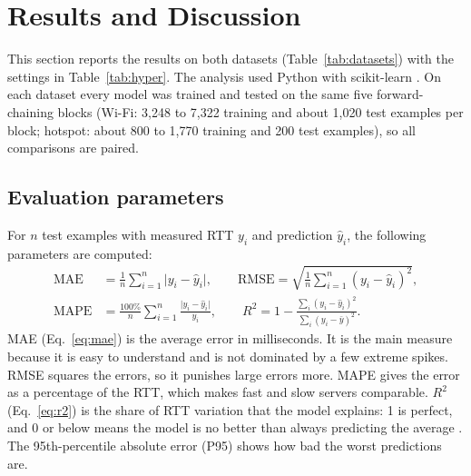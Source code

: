\documentclass[pdflatex,sn-mathphys-num]{sn-jnl}
\begin{document}
\section{Results and Discussion}\label{sec:results}

This section reports the results on both datasets (Table~\ref{tab:datasets}) with the settings in Table~\ref{tab:hyper}. The analysis used Python with scikit-learn \cite{pedregosa2011sklearn}. On each dataset every model was trained and tested on the same five forward-chaining blocks (Wi-Fi: 3{,}248 to 7{,}322 training and about 1{,}020 test examples per block; hotspot: about 800 to 1{,}770 training and 200 test examples), so all comparisons are paired.

\subsection{Evaluation parameters}\label{sec:metrics}

For $n$ test examples with measured RTT $y_i$ and prediction $\hat{y}_i$, the following parameters are computed:
\begin{align}
\mathrm{MAE} &= \frac{1}{n}\sum_{i=1}^{n} \lvert y_i - \hat{y}_i \rvert, \qquad
\mathrm{RMSE} = \sqrt{\frac{1}{n}\sum_{i=1}^{n} (y_i - \hat{y}_i)^2}, \label{eq:mae}\\
\mathrm{MAPE} &= \frac{100\%}{n}\sum_{i=1}^{n} \frac{\lvert y_i - \hat{y}_i \rvert}{y_i}, \qquad
R^2 = 1 - \frac{\sum_i (y_i - \hat{y}_i)^2}{\sum_i (y_i - \bar{y})^2}. \label{eq:r2}
\end{align}
MAE (Eq.~\ref{eq:mae}) is the average error in milliseconds. It is the main measure because it is easy to understand and is not dominated by a few extreme spikes. RMSE squares the errors, so it punishes large errors more. MAPE gives the error as a percentage of the RTT, which makes fast and slow servers comparable. $R^2$ (Eq.~\ref{eq:r2}) is the share of RTT variation that the model explains: 1 is perfect, and 0 or below means the model is no better than always predicting the average \cite{hyndman2006accuracy}. The 95th-percentile absolute error (P95) shows how bad the worst predictions are.
\end{document}
